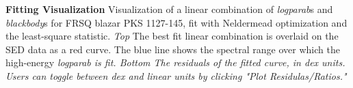 \textbf{\label{fig:fitting_window} Fitting Visualization} Visualization of a linear combination of {\it{logparab}}s and {\it{blackbody}}s for FRSQ blazar PKS 1127-145, fit with Neldermead optimization and the least-square statistic. {\it{Top}} The best fit linear combination is overlaid on the SED data as a red curve. The blue line shows the spectral range over which the high-energy \it{logparab} is fit. \it{Bottom} The residuals of the fitted curve, in dex units. Users can toggle between dex and linear units by clicking "Plot Residulas/Ratios."